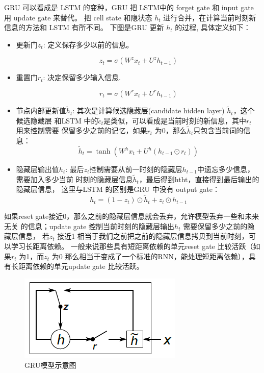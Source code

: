 \documentclass[12pt,a4paper]{article}
\begin{document}
GRU 可以看成是 LSTM 的变种，GRU 把 LSTM中的 forget gate 和 input gate 用 update gate 来替代。 把 cell state 和隐状态 $h_t$ 进行合并，在计算当前时刻新信息的方法和 LSTM 有所不同。 下图是GRU 更新 $h_t$ 的过程\cite{DBLP:journals/corr/Pezeshki15}, 具体定义如下：
\begin{itemize}
\item 更新门$z_t$: 定义保存多少以前的信息。

\[z_t = \sigma ( W^z x_t+ U^z h_{t-1}  )\]

\item 重置门$r_t$: 决定保留多少输入信息.

\[r_t = \sigma(W^r x_t  + U^r h_{t-1}  )\]

\item 节点内部更新值$\tilde h_t $: 其次是计算候选隐藏层(candidate hidden layer) $\tilde h_t$，这个候选隐藏层 和LSTM 中的$\tilde c_t$是类似，可以看成是当前时刻的新信息，其中$r_t$ 用来控制需要 保留多少之前的记忆，如果$r_t$ 为0，那么$\tilde h_t$只包含当前词的信息：
 \[\tilde h_t  = \tanh (W^h x_t  + U^h(h_{t-1} \odot r_t) )\]

\item 隐藏层输出值$h_t$: 最后$z_t$控制需要从前一时刻的隐藏层$h_{t−1}$中遗忘多少信息，需要加入多少当前 时刻的隐藏层信息$\tilde h_t$，最后得到htht，直接得到最后输出的隐藏层信息， 这里与LSTM 的区别是GRU 中没有 output gate：
\[h_t = (1-z_t)\odot \tilde h_t  + z_t \odot h_{t-1}\]
\end{itemize}
如果reset gate接近0，那么之前的隐藏层信息就会丢弃，允许模型丢弃一些和未来无关 的信息；update gate 控制当前时刻的隐藏层输出$h_t$ 需要保留多少之前的隐藏层信息， 若$z_t$ 接近1 相当于我们之前把之前的隐藏层信息拷贝到当前时刻，可以学习长距离依赖。 一般来说那些具有短距离依赖的单元reset gate 比较活跃（如果$r_t$ 为1，而$z_t$ 为$0$ 那么相当于变成了一个标准的RNN，能处理短距离依赖），具有长距离依赖的单元update gate 比较活跃。

\begin{figure}
  \centering
  \includegraphics[width=0.6\linewidth]{./figures/gru.png}
  \caption{GRU模型示意图}\label{fig:gru}
\end{figure}
\end{document}
